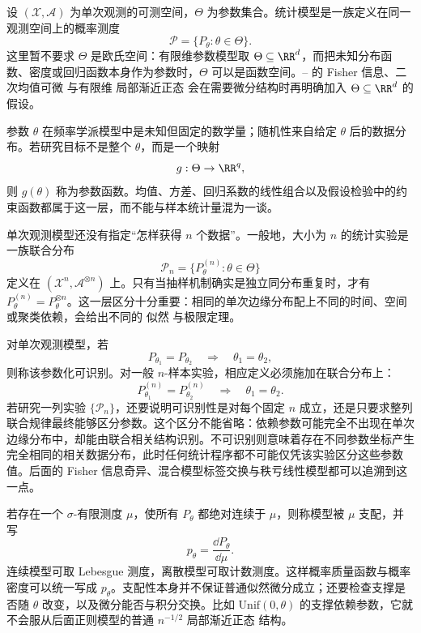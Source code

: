 \begin{definition}[模型、实验、可识别性与支配性]
设 $(\mathcal X,\mathcal A)$ 为单次观测的可测空间，$\Theta$ 为参数集合。统计模型是一族定义在同一观测空间上的概率测度
\begin{equation*}\mathcal P=\{P_\theta:\theta\in\Theta\}.
\end{equation*}
这里暂不要求 $\Theta$ 是欧氏空间：有限维参数模型取 $\Theta\subseteq\RR^d$，而把未知分布函数、密度或回归函数本身作为参数时，$\Theta$ 可以是函数空间。-- 的 Fisher 信息、二次均值可微 与有限维 局部渐近正态 会在需要微分结构时再明确加入 $\Theta\subseteq\RR^d$ 的假设。

参数 $\theta$ 在频率学派模型中是未知但固定的数学量；随机性来自给定 $\theta$ 后的数据分布。若研究目标不是整个 $\theta$，而是一个映射
\[
 g:\Theta\to\RR^q,
\]
则 $g(\theta)$ 称为参数函数。均值、方差、回归系数的线性组合以及假设检验中的约束函数都属于这一层，而不能与样本统计量混为一谈。

单次观测模型还没有指定“怎样获得 $n$ 个数据”。一般地，大小为 $n$ 的统计实验是一族联合分布
\[
 \mathcal P_n
 =\{P_\theta^{(n)}:\theta\in\Theta\}
\]
定义在 $(\mathcal X^n,\mathcal A^{\otimes n})$ 上。只有当抽样机制确实是独立同分布重复时，才有 $P_\theta^{(n)}=P_\theta^{\otimes n}$。这一层区分十分重要：相同的单次边缘分布配上不同的时间、空间或聚类依赖，会给出不同的 似然 与极限定理。

对单次观测模型，若
\[
 P_{\theta_1}=P_{\theta_2}
 \quad\Longrightarrow\quad
 \theta_1=\theta_2,
\]
则称该参数化可识别。对一般 $n$-样本实验，相应定义必须施加在联合分布上：
\[
 P_{\theta_1}^{(n)}=P_{\theta_2}^{(n)}
 \quad\Longrightarrow\quad
 \theta_1=\theta_2.
\]
若研究一列实验 $\{\mathcal P_n\}$，还要说明可识别性是对每个固定 $n$ 成立，还是只要求整列联合规律最终能够区分参数。这个区分不能省略：依赖参数可能完全不出现在单次边缘分布中，却能由联合相关结构识别。不可识别则意味着存在不同参数坐标产生完全相同的相关数据分布，此时任何统计程序都不可能仅凭该实验区分这些参数值。后面的 Fisher 信息奇异、混合模型标签交换与秩亏线性模型都可以追溯到这一点。

若存在一个 $\sigma$-有限测度 $\mu$，使所有 $P_\theta$ 都绝对连续于 $\mu$，则称模型被 $\mu$ 支配，并写
\[
 p_\theta=\frac{\dd P_\theta}{\dd\mu}.
\]
连续模型可取 Lebesgue 测度，离散模型可取计数测度。这样概率质量函数与概率密度可以统一写成 $p_\theta$。支配性本身并不保证普通似然微分成立；还要检查支撑是否随 $\theta$ 改变，以及微分能否与积分交换。比如 $\mathrm{Unif}(0,\theta)$ 的支撑依赖参数，它就不会服从后面正则模型的普通 $n^{-1/2}$ 局部渐近正态 结构。

\end{definition}

